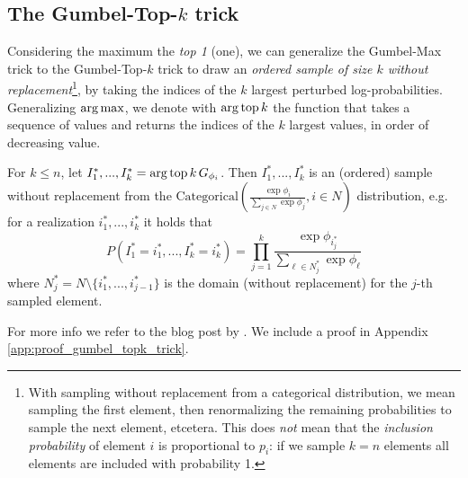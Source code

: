 \subsection{The Gumbel-Top-$k$ trick}
Considering the maximum the \emph{top 1} (one), we can generalize the Gumbel-Max trick to the Gumbel-Top-$k$ trick to draw an \emph{ordered sample of size $k$ without replacement}\footnote{With sampling without replacement from a categorical distribution, we mean sampling the first element, then renormalizing the remaining probabilities to sample the next element, etcetera. This does \emph{not} mean that the \emph{inclusion probability} of element $i$ is proportional to $p_i$: if we sample $k = n$ elements all elements are included with probability 1.}, by taking the indices of the $k$ largest perturbed log-probabilities. 
Generalizing $\operatorname*{arg\,max}$, we denote with $\operatorname*{arg\,top} k$ the function that takes a sequence of values and returns the indices of the $k$ largest values, in order of decreasing value.
\begin{theorem}
\label{thm:gumbel_top_k}
For $k \le n$, let $I^*_1, ..., I^*_k = \operatorname*{arg\,top} k \,{ G_{\phi_i} }$. Then $I^*_1, ..., I^*_k$ is an (ordered) sample without replacement from the $\text{Categorical} \left( \frac{\exp{\phi_i}}{\sum_{j \in N} \exp{\phi_j}}, i \in N \right)$ distribution, e.g. for a realization $i^*_1, ..., i^*_k$ it holds that
\begin{equation}
\label{eq:theorem_topk_trick}
    P\left(I^*_1 = i^*_1, ..., I^*_k = i^*_k\right) = \prod_{j=1}^k \frac{\exp{\phi_{i^*_j}}}{\sum_{\ell \in N^*_j} \exp{\phi_\ell}}
\end{equation}
where $N^*_j = N \setminus \{i^*_1, ..., i^*_{j-1}\}$ is the domain (without replacement) for the $j$-th sampled element.
\end{theorem}

For more info we refer to the blog post by \citet{vieira2014gumbel}. We include a proof in Appendix \ref{app:proof_gumbel_topk_trick}.


